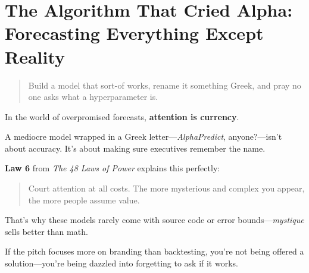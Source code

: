\section{The Algorithm That Cried Alpha: Forecasting Everything Except Reality}


\begin{quote}
Build a model that sort-of works, rename it something Greek, and pray no one asks what a hyperparameter is.
\end{quote}


  In the world of overpromised forecasts, \textbf{attention is currency}.
  
  \medskip
  
  A mediocre model wrapped in a Greek letter—\textit{AlphaPredict\texttrademark}, anyone?—isn’t about accuracy. It’s about making sure executives remember the name.
  
  \medskip
  
  \textbf{Law 6} from \textit{The 48 Laws of Power} explains this perfectly:
  \begin{quote}
  Court attention at all costs. The more mysterious and complex you appear, the more people assume value.
  \end{quote}
  
  \medskip
  
  That’s why these models rarely come with source code or error bounds—\textit{mystique} sells better than math.
  
  \medskip
  
  If the pitch focuses more on branding than backtesting, you're not being offered a solution—you’re being dazzled into forgetting to ask if it works.
  
  



